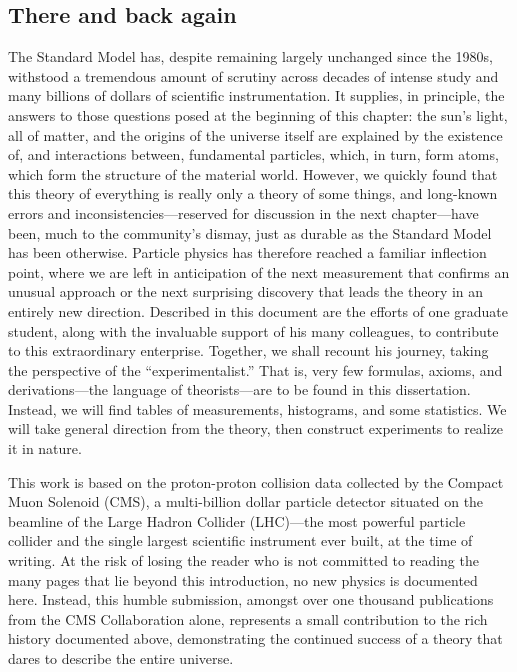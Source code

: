 \begin{dissertationintroduction}
\section*{There and back again}
The Standard Model has, despite remaining largely unchanged since the 1980s, withstood a tremendous amount of scrutiny across decades of intense study and many billions of dollars of scientific instrumentation. %
It supplies, in principle, the answers to those questions posed at the beginning of this chapter: the sun's light, all of matter, and the origins of the universe itself are explained by the existence of, and interactions between, fundamental particles, which, in turn, form atoms, which form the structure of the material world. 
However, we quickly found that this theory of everything is really only a theory of some things, and long-known errors and inconsistencies---reserved for discussion in the next chapter---have been, much to the community's dismay, just as durable as the Standard Model has been otherwise. 
Particle physics has therefore reached a familiar inflection point, where we are left in anticipation of the next measurement that confirms an unusual approach or the next surprising discovery that leads the theory in an entirely new direction. 
Described in this document are the efforts of one graduate student, along with the invaluable support of his many colleagues, to contribute to this extraordinary enterprise. 
Together, we shall recount his journey, taking the perspective of the ``experimentalist.'' 
That is, very few formulas, axioms, and derivations---the language of theorists---are to be found in this dissertation. 
Instead, we will find tables of measurements, histograms, and some statistics. 
We will take general direction from the theory, then construct experiments to realize it in nature. 

This work is based on the proton-proton collision data collected by the Compact Muon Solenoid (CMS), a multi-billion dollar particle detector situated on the beamline of the Large Hadron Collider (LHC)---the most powerful particle collider and the single largest scientific instrument ever built, at the time of writing. 
At the risk of losing the reader who is not committed to reading the many pages that lie beyond this introduction, no new physics is documented here.
Instead, this humble submission, amongst over one thousand publications from the CMS Collaboration alone, represents a small contribution to the rich history documented above, demonstrating the continued success of a theory that dares to describe the entire universe.
\end{dissertationintroduction}
